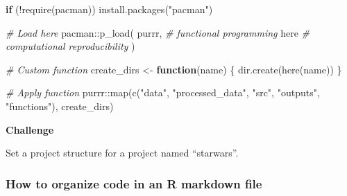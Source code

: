 \documentclass[
]{book}
\newenvironment{Shaded}{\begin{snugshade}}{\end{snugshade}}
\newcommand{\CommentTok}[1]{\textcolor[rgb]{0.56,0.35,0.01}{\textit{#1}}}
\newcommand{\ControlFlowTok}[1]{\textcolor[rgb]{0.13,0.29,0.53}{\textbf{#1}}}
\newcommand{\FunctionTok}[1]{\textcolor[rgb]{0.00,0.00,0.00}{#1}}
\newcommand{\NormalTok}[1]{#1}
\newcommand{\OtherTok}[1]{\textcolor[rgb]{0.56,0.35,0.01}{#1}}
\newcommand{\SpecialCharTok}[1]{\textcolor[rgb]{0.00,0.00,0.00}{#1}}
\newcommand{\StringTok}[1]{\textcolor[rgb]{0.31,0.60,0.02}{#1}}
\begin{document}
\begin{Shaded}
\begin{Highlighting}[]
\ControlFlowTok{if}\NormalTok{ (}\SpecialCharTok{!}\FunctionTok{require}\NormalTok{(pacman)) }\FunctionTok{install.packages}\NormalTok{(}\StringTok{"pacman"}\NormalTok{)}

\CommentTok{\# Load here}
\NormalTok{pacman}\SpecialCharTok{::}\FunctionTok{p\_load}\NormalTok{(}
\NormalTok{  purrr, }\CommentTok{\# functional programming}
\NormalTok{  here }\CommentTok{\# computational reproducibility}
\NormalTok{)}

\CommentTok{\# Custom function}
\NormalTok{create\_dirs }\OtherTok{\textless{}{-}} \ControlFlowTok{function}\NormalTok{(name) \{}
  \FunctionTok{dir.create}\NormalTok{(}\FunctionTok{here}\NormalTok{(name))}
\NormalTok{\}}

\CommentTok{\# Apply function }
\NormalTok{purrr}\SpecialCharTok{::}\FunctionTok{map}\NormalTok{(}\FunctionTok{c}\NormalTok{(}\StringTok{"data"}\NormalTok{, }\StringTok{"processed\_data"}\NormalTok{, }\StringTok{"src"}\NormalTok{, }\StringTok{"outputs"}\NormalTok{, }\StringTok{"functions"}\NormalTok{), create\_dirs)}
\end{Highlighting}
\end{Shaded}

\textbf{Challenge}

Set a project structure for a project named ``starwars''.

\hypertarget{how-to-organize-code-in-an-r-markdown-file}{%
\subsubsection{How to organize code in an R markdown file}\label{how-to-organize-code-in-an-r-markdown-file}}
\end{document}
